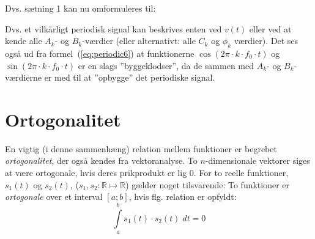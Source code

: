 \documentclass[11pt,a4paper]{article}
\begin{document}
\noindent{}Dvs. sætning 1 kan nu omformuleres til:

\vspace{\baselineskip}\vspace{\baselineskip}

\noindent{}Dvs. et vilkårligt periodisk signal kan beskrives enten ved $v(t)$ eller ved at kende alle $A_{k}$- og $B_{k}$-værdier (eller alternativt: alle $C_k$ og $\phi_k$ værdier). Det ses også ud fra formel~(\ref{eq:periodic6}) at funktionerne $\cos(2\pi\cdot{}k\cdot{}f_{0}\cdot{}t)$ og $\sin(2\pi\cdot{}k\cdot{}f_{0}\cdot{}t)$ er en slags ''byggeklodser'', da de sammen med $A_{k}$- og $B_{k}$-værdierne er med til at ''opbygge'' det periodiske signal.

\section{Ortogonalitet}
En vigtig (i denne sammenhæng) relation mellem funktioner er begrebet \emph{ortogonalitet}, der også kendes fra vektoranalyse. To $n$-dimensionale vektorer siges at være ortogonale, hvis deres prikprodukt er lig 0. For to reelle funktioner, $s_{1}(t)$ og $s_{2}(t)$, ($s_{1},s_{2}:\mathbb{R}\mapsto\mathbb{R}$) gælder noget tilsvarende: To funktioner er \emph{ortogonale} over et interval $\left[ a ; b \right]$, hvis flg. relation er opfyldt:
\begin{equation}\label{eq:ortho}
\int\limits_{a}^{b} s_{1}(t)\cdot{}s_{2}(t)\;{}dt = 0
\end{equation} 
\end{document}
